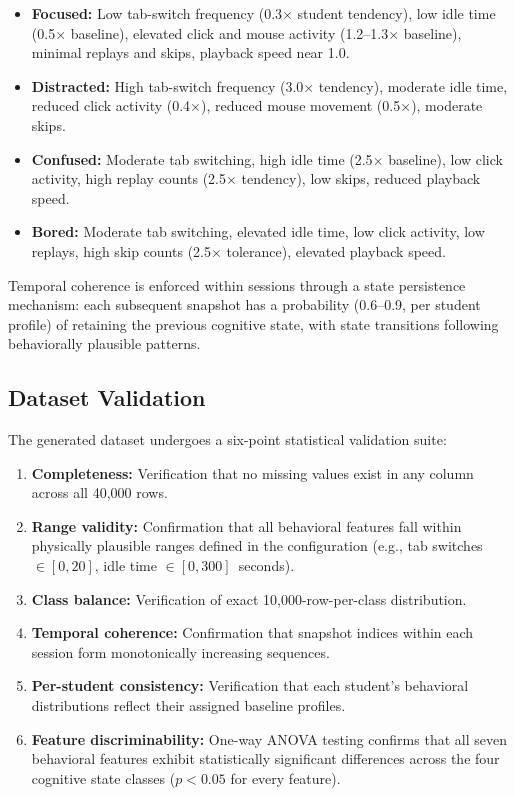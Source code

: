 \documentclass[conference]{IEEEtran}
\begin{document}
\begin{itemize}[leftmargin=*]
    \item \textbf{Focused:} Low tab-switch frequency (0.3$\times$ student tendency), low idle time (0.5$\times$ baseline), elevated click and mouse activity (1.2--1.3$\times$ baseline), minimal replays and skips, playback speed near 1.0.
    \item \textbf{Distracted:} High tab-switch frequency (3.0$\times$ tendency), moderate idle time, reduced click activity (0.4$\times$), reduced mouse movement (0.5$\times$), moderate skips.
    \item \textbf{Confused:} Moderate tab switching, high idle time (2.5$\times$ baseline), low click activity, high replay counts (2.5$\times$ tendency), low skips, reduced playback speed.
    \item \textbf{Bored:} Moderate tab switching, elevated idle time, low click activity, low replays, high skip counts (2.5$\times$ tolerance), elevated playback speed.
\end{itemize}

Temporal coherence is enforced within sessions through a state persistence mechanism: each subsequent snapshot has a probability (0.6--0.9, per student profile) of retaining the previous cognitive state, with state transitions following behaviorally plausible patterns.

\subsection{Dataset Validation}

The generated dataset undergoes a six-point statistical validation suite:
\begin{enumerate}[leftmargin=*]
    \item \textbf{Completeness:} Verification that no missing values exist in any column across all 40,000 rows.
    \item \textbf{Range validity:} Confirmation that all behavioral features fall within physically plausible ranges defined in the configuration (e.g., tab switches $\in [0, 20]$, idle time $\in [0, 300]$~seconds).
    \item \textbf{Class balance:} Verification of exact 10,000-row-per-class distribution.
    \item \textbf{Temporal coherence:} Confirmation that snapshot indices within each session form monotonically increasing sequences.
    \item \textbf{Per-student consistency:} Verification that each student's behavioral distributions reflect their assigned baseline profiles.
    \item \textbf{Feature discriminability:} One-way ANOVA testing confirms that all seven behavioral features exhibit statistically significant differences across the four cognitive state classes ($p < 0.05$ for every feature).
\end{enumerate}
\end{document}

